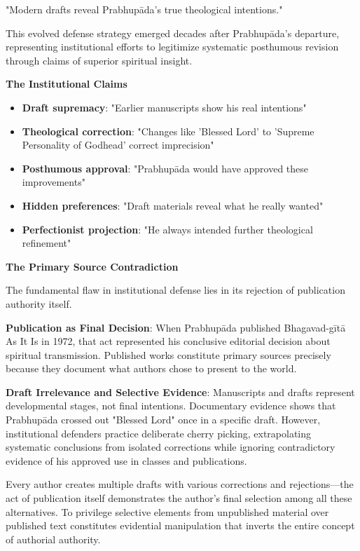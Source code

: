 \documentclass[11pt,twoside]{book}
\begin{document}
\begin{itemize}
"Modern drafts reveal Prabhupāda's true theological intentions."

This evolved defense strategy emerged decades after Prabhupāda's departure, representing institutional efforts to legitimize systematic posthumous revision through claims of superior spiritual insight.

\textbf{\textbf{The Institutional Claims}}
\begin{itemize}
\item \textbf{\textbf{Draft supremacy}}: "Earlier manuscripts show his real intentions"
\item \textbf{\textbf{Theological correction}}: "Changes like 'Blessed Lord' to 'Supreme Personality of Godhead' correct imprecision"
\item \textbf{\textbf{Posthumous approval}}: "Prabhupāda would have approved these improvements"
\item \textbf{\textbf{Hidden preferences}}: "Draft materials reveal what he really wanted"
\item \textbf{\textbf{Perfectionist projection}}: "He always intended further theological refinement"
\end{itemize}

\textbf{\textbf{The Primary Source Contradiction}}

The fundamental flaw in institutional defense lies in its rejection of publication authority itself.

\textbf{\textbf{\textbf{Publication as Final Decision}}}: When Prabhupāda published Bhagavad-gītā As It Is in 1972, that act represented his conclusive editorial decision about spiritual transmission. Published works constitute primary sources precisely because they document what authors chose to present to the world.

\textbf{\textbf{\textbf{Draft Irrelevance and Selective Evidence}}}: Manuscripts and drafts represent developmental stages, not final intentions. Documentary evidence shows that Prabhupāda crossed out "Blessed Lord" once in a specific draft. However, institutional defenders practice deliberate cherry picking, extrapolating systematic conclusions from isolated corrections while ignoring contradictory evidence of his approved use in classes and publications.

Every author creates multiple drafts with various corrections and rejections—the act of publication itself demonstrates the author's final selection among all these alternatives. To privilege selective elements from unpublished material over published text constitutes evidential manipulation that inverts the entire concept of authorial authority.


\end{itemize}
\end{document}
